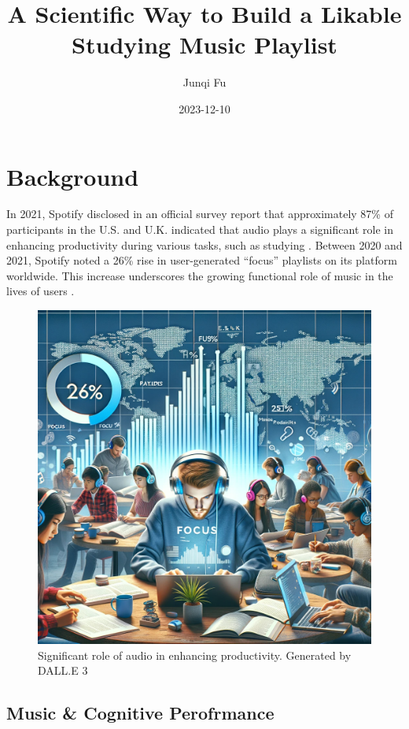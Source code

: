 \documentclass[
]{book}
\title{A Scientific Way to Build a Likable Studying Music Playlist}
\author{Junqi Fu}
\date{2023-12-10}
\begin{document}
\maketitle

{
\setcounter{tocdepth}{1}
\tableofcontents
}
\hypertarget{background}{%
\chapter{Background}\label{background}}

In 2021, Spotify disclosed in an official survey report that approximately 87\% of participants in the U.S. and U.K. indicated that audio plays a significant role in enhancing productivity during various tasks, such as studying \citep{Spotify2021}. Between 2020 and 2021, Spotify noted a 26\% rise in user-generated ``focus'' playlists on its platform worldwide. This increase underscores the growing functional role of music in the lives of users \citep{Spotify2021}.

\begin{figure}
\centering
\includegraphics{1.png}
\caption{Significant role of audio in enhancing productivity. Generated by DALL.E 3}
\end{figure}

\hypertarget{music-cognitive-perofrmance}{%
\section{Music \& Cognitive Perofrmance}\label{music-cognitive-perofrmance}}
\end{document}
